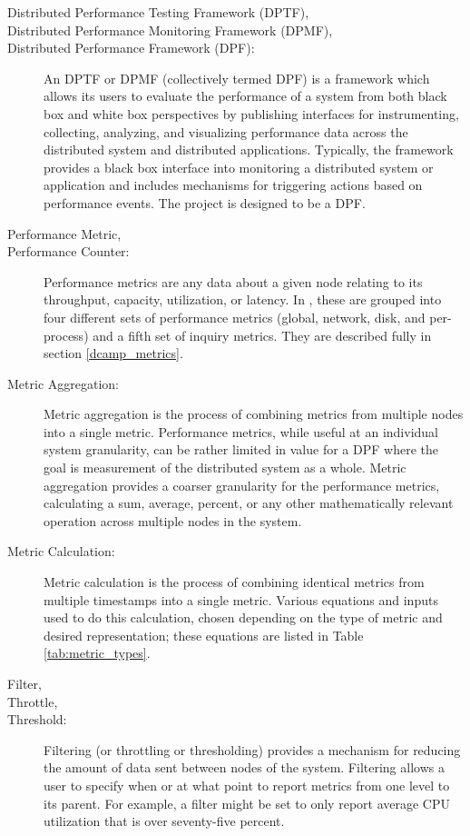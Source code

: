 \begin{description}

\item[Distributed Performance Testing Framework (DPTF),]
\item[Distributed Performance Monitoring Framework (DPMF),]
\item[Distributed Performance Framework (DPF):]

An DPTF or DPMF (collectively termed DPF) is a framework which allows its users to evaluate the performance of a system
from both black box and white box perspectives by publishing interfaces for instrumenting, collecting, analyzing, and
visualizing performance data across the distributed system and distributed applications. Typically, the framework
provides a black box interface into monitoring a distributed system or application and includes mechanisms for
triggering actions based on performance events. The \dcamp project is designed to be a DPF. 

\item[Performance Metric,]
\item[Performance Counter:]
Performance metrics are any data about a given node relating to its throughput, capacity, utilization, or latency. In
\dcamp, these are grouped into four different sets of performance metrics (global, network, disk, and per-process) and a
fifth set of inquiry metrics. They are described fully in section \ref{dcamp_metrics}. 

\item[Metric Aggregation:]
Metric aggregation is the process of combining metrics from multiple nodes into a single metric. Performance metrics,
while useful at an individual system granularity, can be rather limited in value for a DPF where the goal is measurement
of the distributed system as a whole. Metric aggregation provides a coarser granularity for the performance metrics,
calculating a sum, average, percent, or any other mathematically relevant operation across multiple nodes in the system. 

\item[Metric Calculation:]
Metric calculation is the process of combining identical metrics from multiple timestamps into a single metric. Various
equations and inputs used to do this calculation, chosen depending on the type of metric and desired representation;
these equations are listed in Table \ref{tab:metric_types}.

\item[Filter,]
\item[Throttle,]
\item[Threshold:]
Filtering (or throttling or thresholding) provides a mechanism for reducing the amount of data sent between nodes of the
system. Filtering allows a user to specify when or at what point to report metrics from one level to its parent. For
example, a filter might be set to only report average CPU utilization that is over seventy-five percent. 


\end{description}
